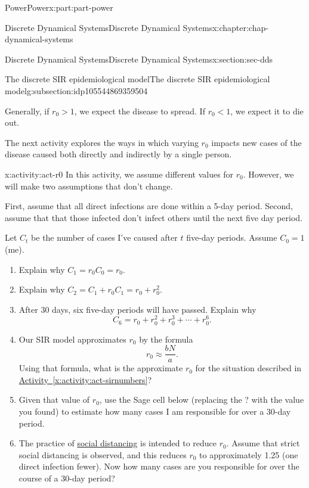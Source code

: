 \documentclass[oneside,10pt,]{book}
\newcommand{\xreffont}{\relax}
\numberwithin{equation}{section}
\newcommand{\lt}{<}
\newcommand{\gt}{>}
\begin{document}
\begin{partptx}{Power}{}{Power}{}{}{x:part:part-power}
\begin{chapterptx}{Discrete Dynamical Systems}{}{Discrete Dynamical Systems}{}{}{x:chapter:chap-dynamical-systems}
\begin{sectionptx}{Discrete Dynamical Systems}{}{Discrete Dynamical Systems}{}{}{x:section:sec-dds}
\begin{subsectionptx}{The discrete SIR epidemiological model}{}{The discrete SIR epidemiological model}{}{}{g:subsection:idp105544869359504}
\par
Generally, if \(r_0 \gt 1\), we expect the disease to spread. If \(r_0 \lt 1\), we expect it to die out.%
\par
The next activity explores the ways in which varying \(r_0\) impacts new cases of the disease caused both directly and indirectly by a single person.%
\begin{activity}{}{x:activity:act-r0}%
In this activity, we assume different values for \(r_0\). However, we will make two assumptions that don't change.%
\par
First, assume that all direct infections are done within a 5-day period. Second, assume that that those infected don't infect others until the next five day period.%
\par
Let \(C_t\) be the number of cases I've caused after \(t\) five-day periods. Assume \(C_0 = 1\) (me).%
%
\begin{enumerate}
\item{}Explain why \(C_1 = r_0 C_0 = r_0\).%
\item{}Explain why \(C_2 = C_1 + r_0 C_1 = r_0 + r_0^2\).%
\item{}After 30 days, six five-day periods will have passed. Explain why%
\begin{equation*}
C_6 = r_0 + r_0^2 + r_0^3 + \cdots + r_0^6.
\end{equation*}
%
\item{}Our SIR model approximates \(r_0\) by the formula%
\begin{equation}
r_0 \approx \frac{bN}{a}.\label{x:men:eq-r0}
\end{equation}
Using that formula, what is the approximate \(r_0\) for the situation described in \hyperref[x:activity:act-sirnumbers]{Activity~{\xreffont\ref{x:activity:act-sirnumbers}}}?%
\item{}Given that value of \(r_0\), use the Sage cell below (replacing the ? with the value you found) to estimate how many cases I am responsible for over a 30-day period.%
\item{}The practice of \href{https://en.wikipedia.org/wiki/Social_distancing}{social distancing}\footnotemark{} is intended to reduce \(r_0\). Assume that strict social distancing is observed, and this reduces \(r_0\) to approximately 1.25 (one direct infection fewer). Now how many cases are you responsible for over the course of a 30-day period?%

\end{enumerate}
\end{activity}
\end{subsectionptx}
\end{sectionptx}
\end{chapterptx}
\end{partptx}
\end{document}
